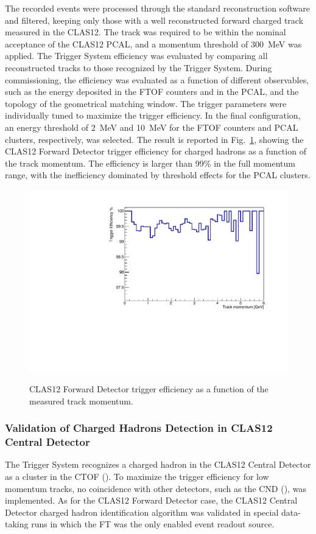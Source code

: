 The recorded events were processed through the standard reconstruction software and filtered, keeping only those with a well reconstructed forward charged track measured in the CLAS12. The track was required to be within the nominal acceptance of the CLAS12 PCAL, and a momentum threshold of 300~MeV was applied. The Trigger System efficiency was evaluated by comparing all reconstructed tracks to those recognized by the Trigger System. During commissioning, the efficiency was evaluated as a function of different observables, such as the energy deposited in the FTOF counters and in the PCAL, and the topology of the geometrical matching window. The trigger parameters were individually tuned to maximize the trigger efficiency. In the final configuration, an energy threshold of 2~MeV and 10~MeV for the FTOF counters and PCAL clusters, respectively, was selected. The result is reported in Fig.~\ref{fig:FD_TrackEfficiency}, showing the CLAS12 Forward Detector trigger efficiency for charged hadrons as a function of the track momentum. The efficiency is larger than 99$\%$ in the full momentum range, with the inefficiency dominated by threshold effects for the PCAL clusters.

\begin{figure}[!htb]
 \centering
{\includegraphics[width=.5\textwidth]{img/FD_TrackEfficiency.pdf}}
 \caption{CLAS12 Forward Detector trigger efficiency as a function of the measured track momentum.}
 \label{fig:FD_TrackEfficiency}
\end{figure}

\subsubsection{Validation of Charged Hadrons Detection in CLAS12 Central Detector}

The Trigger System recognizes a charged hadron in the CLAS12 Central Detector as a cluster in the CTOF (\cite{ctof-ref}). To maximize the trigger efficiency for low momentum tracks, no coincidence with other detectors, such as the CND (\cite{cnd-ref}), was implemented. As for the CLAS12 Forward Detector case, the CLAS12 Central Detector charged hadron identification algorithm was validated in special data-taking runs in which the FT was the only enabled event readout source. 

